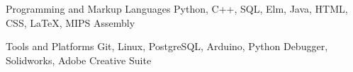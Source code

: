 

\begin{cvskills}

  \cvskill
    {Programming and Markup Languages} %
    {Python, C++, SQL, Elm, Java, HTML, CSS, LaTeX, MIPS Assembly} %

  \cvskill
    {Tools and Platforms} %
    {Git, Linux, PostgreSQL, Arduino, Python Debugger, Solidworks, Adobe Creative Suite} %

\end{cvskills}
